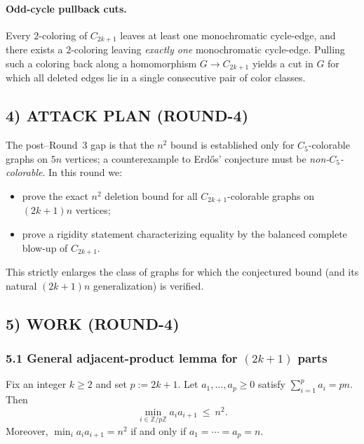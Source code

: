\paragraph{Odd-cycle pullback cuts.}
Every $2$-coloring of $C_{2k+1}$ leaves at least one monochromatic cycle-edge, and there
exists a $2$-coloring leaving \emph{exactly one} monochromatic cycle-edge. Pulling such a
coloring back along a homomorphism $G\to C_{2k+1}$ yields a cut in $G$ for which all
deleted edges lie in a single consecutive pair of color classes.

\subsection*{4) ATTACK PLAN (ROUND-4)}
The post--Round~3 gap is that the $n^2$ bound is established only for $C_5$-colorable graphs
on $5n$ vertices; a counterexample to Erd\H{o}s' conjecture must be \emph{non-$C_5$-colorable}.
In this round we:
\begin{itemize}
\item prove the exact $n^2$ deletion bound for all $C_{2k+1}$-colorable graphs on $(2k+1)n$ vertices;
\item prove a rigidity statement characterizing equality by the balanced complete blow-up of $C_{2k+1}$.
\end{itemize}
This strictly enlarges the class of graphs for which the conjectured bound (and its natural
$(2k+1)n$ generalization) is verified.

\subsection*{5) WORK (ROUND-4)}

\subsubsection*{5.1 General adjacent-product lemma for $(2k+1)$ parts}
\begin{lemma}\label{lem:adjprod_odd}
Fix an integer $k\ge 2$ and set $p:=2k+1$.
Let $a_1,\dots,a_p\ge 0$ satisfy $\sum_{i=1}^p a_i = pn$.
Then
\[
\min_{i\in\mathbb Z/p\mathbb Z} a_i a_{i+1}\ \le\ n^2.
\]
Moreover, $\min_i a_i a_{i+1}=n^2$ if and only if $a_1=\cdots=a_p=n$.
\end{lemma}

